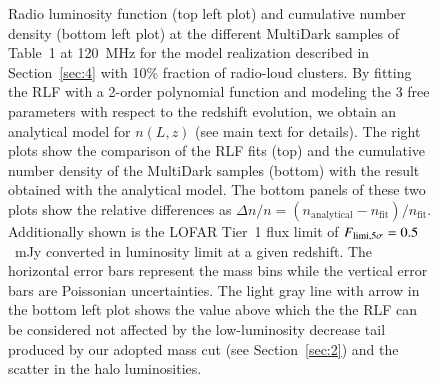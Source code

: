 \documentclass[traditabstract]{aa}
\newcommand{\rmn}{\mathrm}
\begin{document}
\begin{figure}[t]
\caption{Radio luminosity function (top left plot) and cumulative number density (bottom left plot) at the different MultiDark samples of Table~1 at 120~MHz for the model realization described in Section~\ref{sec:4} with 10\% fraction of radio-loud clusters. By fitting the RLF with a 2-order polynomial function and modeling the 3 free parameters with respect to the redshift evolution, we obtain an analytical model for $n(L,z)$ (see main text for details). The right plots show the comparison of the RLF fits (top) and the cumulative number density of the MultiDark samples (bottom) with the result obtained with the analytical model. The bottom panels of these two plots show the relative differences as $\Delta n / n = (n_{\rmn{analytical}} - n_{\rmn{fit}})/n_{\rmn{fit}}$. Additionally shown is the LOFAR Tier~1 flux limit of $F_{\rm{limi},5\sigma}=0.5$~mJy \citep{2012JApA..tmp...34R} converted in luminosity limit at a given redshift. The horizontal error bars represent the mass bins while the vertical error bars are Poissonian uncertainties. The light gray line with arrow in the bottom left plot shows the value above which the the RLF can be considered not affected by the low-luminosity decrease tail produced by our adopted mass cut (see Section~\ref{sec:2}) and the scatter in the halo luminosities.}
\label{fig:RLF_120}
\end{figure} 
 
\end{document}
